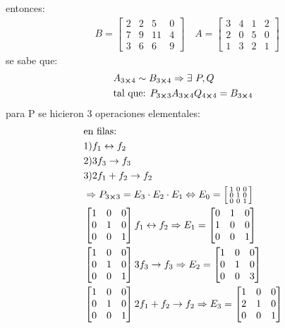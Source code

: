 	entonces:
	\begin{align*}
		&B=\begin{bmatrix}
			2&2&5&0\\
			7&9&11&4\\
			3&6&6&9
		\end{bmatrix}\quad A=\begin{bmatrix}
			3&4&1&2\\
			2&0&5&0\\
			1&3&2&1
		\end{bmatrix}
	\end{align*}
	se sabe que:
	\begin{align*}
		&A_{3\cross 4}\sim B_{3\cross 4} \Rightarrow \exists \ P, Q \\
		&\text{tal que: }P_{3\cross3}A_{3\cross4}Q_{4\cross4}=B_{3\cross4}
	\end{align*}
	para P se hicieron 3 operaciones elementales:
	\begin{align*}
		&\text{en filas:}\\
		&\text{1)}f_1\leftrightarrow f_2\\
		&\text{2)}3f_3\rightarrow f_3\\
		&\text{3)}2f_1+f_2\rightarrow f_2\\
		&\Rightarrow P_{3\cross3}=E_3\cdot E_2\cdot E_1 \Leftrightarrow E_0=\left[\begin{smallmatrix}
			1&0&0\\
			0&1&0\\
			0&0&1
		\end{smallmatrix}\right]\\
		&\begin{bmatrix}
			1&0&0\\
			0&1&0\\
			0&0&1
		\end{bmatrix} f_1\leftrightarrow f_2 \Rightarrow E_1= \begin{bmatrix}
			0&1&0\\
			1&0&0\\
			0&0&1
		\end{bmatrix}\\
		&\begin{bmatrix}
			1&0&0\\
			0&1&0\\
			0&0&1
		\end{bmatrix} 3f_3\rightarrow f_3 \Rightarrow E_2= \begin{bmatrix}
			1&0&0\\
			0&1&0\\
			0&0&3
		\end{bmatrix}\\
		&\begin{bmatrix}
			1&0&0\\
			0&1&0\\
			0&0&1
		\end{bmatrix} 2f_1+f_2\rightarrow f_2 \Rightarrow E_3= \begin{bmatrix}
			1&0&0\\
			2&1&0\\
			0&0&1
		\end{bmatrix}
	\end{align*}
